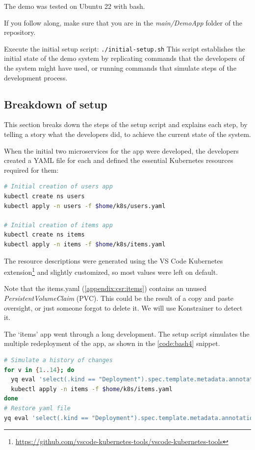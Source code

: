 The demo was tested on Ubuntu 22 with bash.

If you follow along, make sure that you are in the \emph{main/DemoApp} folder of the repository.

Execute the initial setup script: \lstinline|./initial-setup.sh| This script establishes the initial state of the demo system by replicating commands that the developers of the system might have used, or running commands that simulate steps of the development process.

\subsection{Breakdown of setup}

This section breaks down the steps of the setup script and explains each step, by telling a story what the developers did, to achieve the current state of the system.

When the initial two microservices for the app were developed, the developers created a YAML file for each and defined the essential Kubernetes resources required for them:

\begin{lstlisting}[caption={Create first deployment},language=bash,label=code:bash3]
# Initial creation of users app
kubectl create ns users
kubectl apply -n users -f $home/k8s/users.yaml

# Initial creation of items app
kubectl create ns items
kubectl apply -n items -f $home/k8s/items.yaml
\end{lstlisting}

The resource descriptions were generated using the VS Code Kubernetes extension\footnote{\url{https://github.com/vscode-kubernetes-tools/vscode-kubernetes-tools}} and slightly customized, so most values were left on default.

Note that the items.yaml (\ref{appendix:csr:items}) contains an unused \emph{PersistentVolumeClaim} (PVC). This could be the result of a copy and paste oversight, or just someone forgot to delete it. We will use Konstrainer to detect it.

The `items' app went through a long development. The setup script simulates the multiple redeployment of the app, as shown in the \ref{code:bash4} snippet.

\begin{lstlisting}[caption={Simulate redeployment of the `items' app},language=bash,label=code:bash4]
# Simulate a history of changes
for v in {1..14}; do
  yq eval 'select(.kind == "Deployment").spec.template.metadata.annotations.v = env(v)' $home/k8s/items.yaml -i
  kubectl apply -n items -f $home/k8s/items.yaml
done
# Restore yaml file
yq eval 'select(.kind == "Deployment").spec.template.metadata.annotations.v = "0"' $home/k8s/items.yaml -i
\end{lstlisting}

